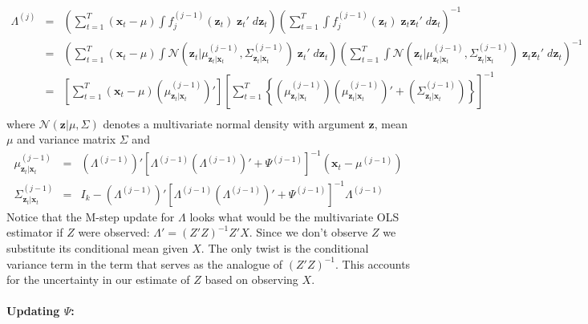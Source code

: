 \documentclass[12pt]{article}
\theoremstyle{definition}
\begin{document}
	\begin{eqnarray*}
		\Lambda^{(j)} &=& \left(\sum_{t = 1}^T  (\textbf{x}_t - \mu)\int f_j^{(j-1)}(\mathbf{z}_t) \; \textbf{z}_t' \; d \mathbf{z}_t\right) \left(\sum_{t=1}^T \int f_j^{(j-1)}(\mathbf{z}_t)\; \textbf{z}_t \textbf{z}_t' \; d \mathbf{z}_t\right)^{-1}\\
			&=&\left(\sum_{t = 1}^T  (\textbf{x}_t - \mu)\int \mathcal{N}\left(\mathbf{z}_t|\mu^{(j-1)}_{\mathbf{z}_t|\mathbf{x}_t}, \Sigma^{(j-1)}_{\mathbf{z}_t|\mathbf{x}_t}\right) \; \textbf{z}_t' \; d \mathbf{z}_t\right) \left(\sum_{t=1}^T \int \mathcal{N}\left(\mathbf{z}_t|\mu^{(j-1)}_{\mathbf{z}_t|\mathbf{x}_t}, \Sigma^{(j-1)}_{\mathbf{z}_t|\mathbf{x}_t}\right)\; \textbf{z}_t \textbf{z}_t' \; d \mathbf{z}_t\right)^{-1}\\
			&=& \left[\sum_{t=1}^T (\mathbf{x}_t - \mu)\left(\mu^{(j-1)}_{\mathbf{z}_t|\mathbf{x}_t} \right)'\right]\left[\sum_{t=1}^T \left\{ \left(\mu^{(j-1)}_{\mathbf{z}_t|\mathbf{x}_t} \right)\left(\mu^{(j-1)}_{\mathbf{z}_t|\mathbf{x}_t} \right)' + \left(\Sigma^{(j-1)}_{\mathbf{z}_t|\mathbf{x}_t} \right) \right\}  \right]^{-1}\\
	\end{eqnarray*}
where $\mathcal{N}(\mathbf{z}|\mu, \Sigma)$ denotes a multivariate normal density with argument $\mathbf{z}$, mean $\mu$ and variance matrix $\Sigma$ and
	\begin{eqnarray*}
		\mu^{(j-1)}_{\mathbf{z}_t|\mathbf{x}_t} &=& \left(\Lambda^{(j-1)}\right)' \left[\Lambda^{(j-1)} \left(\Lambda^{(j-1)}\right)' + \Psi^{(j-1)}\right]^{-1}
		\left(\mathbf{x}_t - \mu^{(j-1)}\right) \\
		\Sigma^{(j-1)}_{\mathbf{z}_t|\mathbf{x}_t}  &=& I_k - \left(\Lambda^{(j-1)}\right)' \left[\Lambda^{(j-1)} \left(\Lambda^{(j-1)}\right)' + \Psi^{(j-1)}\right]^{-1}\Lambda^{(j-1)}
	\end{eqnarray*}
Notice that the M-step update for $\Lambda$ looks what would be the multivariate OLS estimator if $Z$ were observed: $\Lambda' = (Z'Z)^{-1}Z'X$. Since we don't observe $Z$ we substitute its conditional mean given $X$. The only twist is the conditional variance term in the term that serves as the analogue of $(Z'Z)^{-1}$. This accounts for the uncertainty in our estimate of $Z$ based on observing $X$.

\paragraph{Updating $\Psi$:}
\end{document}
